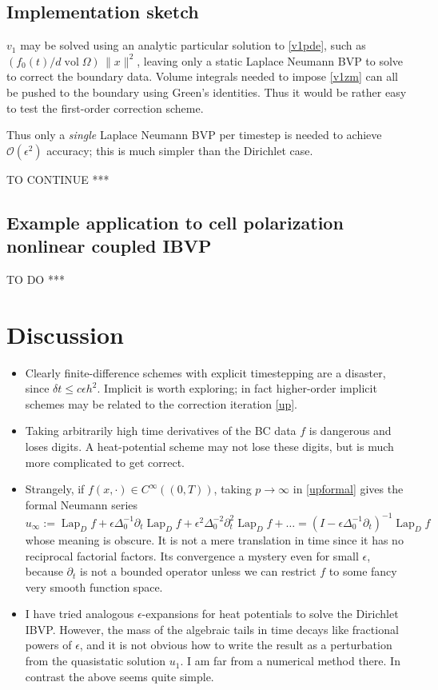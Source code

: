 \documentclass[10pt]{article}
\newcommand{\bi}{\begin{itemize}}
\newcommand{\ei}{\end{itemize}}
\newcommand{\be}{\begin{equation}}
\newcommand{\ee}{\end{equation}}
\newcommand{\bigO}{{\mathcal O}}
\DeclareMathOperator{\vol}{vol}
\newcommand{\eps}{\epsilon}
\newcommand{\dt}{\partial_t}
\DeclareMathOperator{\Lap}{Lap}
\begin{document}
\subsection{Implementation sketch}

$v_1$ may be solved using an analytic particular solution to \eqref{v1pde},
such as $(f_0(t)/d \vol\Omega)\,\|x\|^2$, leaving
only a static Laplace Neumann BVP to solve to correct the boundary data.
Volume integrals needed to impose \eqref{v1zm} can all be pushed
to the boundary using Green's identities.
Thus it would be rather easy to test the first-order correction scheme.

Thus only a {\em single} Laplace Neumann BVP per timestep is needed
to achieve $\bigO(\eps^2)$ accuracy; this is much simpler than
the Dirichlet case.

TO CONTINUE ***


\subsection{Example application to cell polarization nonlinear coupled IBVP}


TO DO ***






\section{Discussion}

\bi
\item
  Clearly finite-difference schemes with explicit timestepping are
  a disaster, since $\delta t \le c \eps h^2$.
  Implicit is worth exploring; in fact higher-order
  implicit schemes may be related to the correction iteration \eqref{up}.
\item
  Taking arbitrarily high time derivatives of the BC data $f$ is dangerous
  and loses digits. A heat-potential scheme may not lose these digits,
  but is much more complicated to get correct.
\item
Strangely, if $f(x,\cdot) \in C^\infty((0,T))$,
taking $p\to\infty$ in \eqref{upformal} gives the formal Neumann series
\be
u_\infty := \Lap_D f + \eps \Delta_0^{-1} \dt \Lap_D f + \eps^2 \Delta_0^{-2} \dt^2 \Lap_D f + \dots
= (I - \eps \Delta_0^{-1} \dt)^{-1} \Lap_D f
\ee
whose meaning is obscure.
It is not a mere translation in time since it has no
reciprocal factorial factors. Its convergence a mystery
even for small $\eps$, because $\dt$ is not a bounded operator
unless we can restrict $f$ to some fancy very smooth function space.
\item
  I have tried analogous $\eps$-expansions for heat potentials
  to solve the Dirichlet IBVP.
  However, the mass of the algebraic tails in time decays like
  fractional powers of $\eps$, and it is not obvious how to
  write the result as a perturbation from the quasistatic solution $u_1$.
  I am far from a numerical method there. In contrast the above seems
  quite simple.
  \ei




\end{document}
